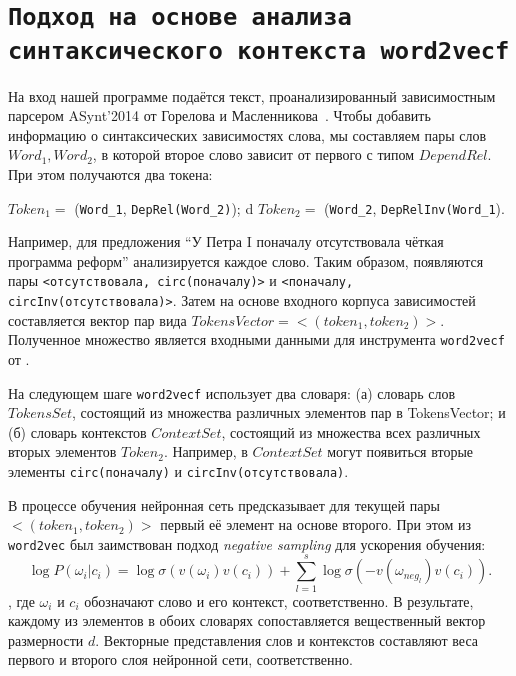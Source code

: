 \documentclass[oneside,senior,etd]{BYUPhys}
\begin{document}




\section{\texttt{Подход на основе анализа синтаксического контекста word2vecf}}
\label{sec:Chapter3} 

На вход нашей программе подаётся текст, проанализированный зависимостным парсером ASynt'2014 от Горелова и Масленникова~. Чтобы добавить информацию о синтаксических зависимостях слова, мы составляем пары слов $Word_1, Word_2$, в которой второе слово зависит от первого с типом $DependRel$. При этом получаются два токена:

\begin{center}
\(Token_1 = \) (\texttt{Word_1}, \texttt{DepRel(Word_2)});
d
\(Token_2 = \) (\texttt{Word_2}, \texttt{DepRelInv(Word_1}).
\end{center}

Например, для предложения ``У Петра I поначалу отсутствовала чёткая программа реформ'' анализируется каждое слово. Таким образом, появляются пары \texttt{<отсутствовала, circ(поначалу)>} и \texttt{<поначалу, circInv(отсутствовала)>}.
Затем на основе входного корпуса зависимостей составляется вектор пар вида $TokensVector = <(token_1, token_2)>$. Полученное множество является входными данными для инструмента \texttt{word2vecf} от \cite{levy1} .

На следующем шаге \texttt{word2vecf} использует два словаря: (а) словарь слов $TokensSet$, состоящий из множества различных элементов пар в TokensVector; и (б) словарь контекстов $ContextSet$, состоящий из множества всех различных вторых элементов ${Token_2}$. Например, в $ContextSet$ могут появиться вторые элементы \texttt{circ(поначалу)} и \texttt{circInv(отсутствовала)}.

В процессе обучения нейронная сеть предсказывает для текущей пары $<(token_1, token_2)>$  первый её элемент на основе второго. При этом из \texttt{word2vec} был заимствован подход \textit{negative sampling} для ускорения обучения:
\[\log P(\omega_i|c_i) = \log \sigma (v(\omega_i) v(c_i)) + \sum_{l=1}^s \log \sigma (- v(\omega_{neg_l}) v(c_i)).\], где $\omega_i$ и $c_i$ обозначают слово и его контекст, соответственно.
В результате, каждому из элементов в обоих словарях сопоставляется вещественный вектор размерности \(d\). Векторные представления слов и контекстов составляют веса первого и второго слоя нейронной сети, соответственно.
\end{document}
